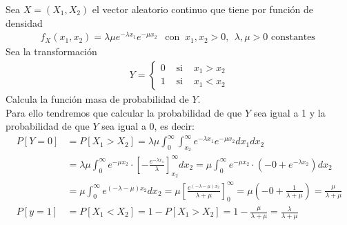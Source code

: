 \begin{ejercicio}
    Sea $X=(X_1, X_2)$ el vector aleatorio continuo que tiene por función de densidad
    \begin{gather*}
        f_X(x_1, x_2) = \lambda \mu e^{-\lambda x_1} e^{-\mu x_2} \ \ \text{ con }\  x_1, x_2>0,\ \  \lambda, \mu>0 \text{ constantes }
    \end{gather*}
    Sea la transformación 
    \begin{gather*}
        Y=\left\{
        \begin{array}{ccc}
            0 & \text{ si } & x_1 > x_2\\
            1 & \text{ si } & x_1 < x_2
        \end{array}
        \right.
    \end{gather*}
    Calcula la función masa de probabilidad de $Y$.\\

    Para ello tendremos que calcular la probabilidad de que $Y$ sea igual a 1 y la probabilidad de que $Y$ sea igual a 0, es decir:
    \begin{align*}
        P[Y=0] &= P[X_1 > X_2] = \lambda \mu \int_0^{\infty}\int_{x_2}^{\infty} e^{-\lambda x_1} e^{-\mu x_2} dx_1 dx_2 \\
        &= \lambda \mu \int_0^{\infty} e^{-\mu x_2} \cdot \left[-\frac{e^{-\lambda x_1}}{\lambda}\right]_{x_2}^{\infty} dx_2 = \mu \int_0^{\infty} e^{-\mu x_2} \cdot (-0 + e^{-\lambda x_2}) dx_2 \\
        &= \mu \int_0^{\infty} e^{(-\lambda -\mu)x_2}dx_2 = \mu \left[\frac{e^{(-\lambda -\mu)x_2}}{\lambda + \mu}\right]_0^{\infty} = \mu \left(-0+\frac{1}{\lambda + \mu}\right) = \frac{\mu}{\lambda + \mu}\\
        P[y=1] &= P[X_1 < X_2] = 1 - P[X_1 > X_2]  =1 - \frac{\mu}{\lambda + \mu}= \frac{\lambda}{\lambda + \mu}
     \end{align*}
\end{ejercicio}

